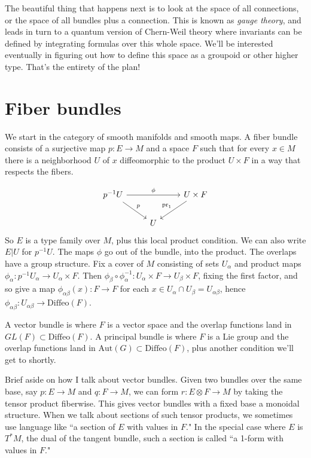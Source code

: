 \documentclass[12pt]{article}
\newcommand{\aut}{\mathrm{Aut}}
\begin{document}
The beautiful thing that happens next is to look at the space of all connections, or the space of all bundles plus a connection. This is known as \emph{gauge theory}, and leads in turn to a quantum version of Chern-Weil theory where invariants can be defined by integrating formulas over this whole space. We'll be interested eventually in figuring out how to define this space as a groupoid or other higher type. That's the entirety of the plan!

\section{Fiber bundles}
We start in the category of smooth manifolds and smooth maps. A fiber bundle consists of a surjective map $p:E\to M$ and a space $F$ such that for every $x\in M$ there is a neighborhood $U$ of $x$ diffeomorphic to the product $U\times F$ in a way that respects the fibers.

\[\begin{tikzcd}
	{p^{-1}U} && {U\times F} \\
	& U
	\arrow["p", from=1-1, to=2-2]
	\arrow["\phi", from=1-1, to=1-3]
	\arrow["{\mathrm{pr}_1}"', from=1-3, to=2-2]
\end{tikzcd}\]
So $E$ is a type family over $M$, plus this local product condition. We can also write $E|U$ for $p^{-1}U$. The maps $\phi$ go out of the bundle, into the product. The overlaps have a group structure. Fix a cover of $M$ consisting of sets $U_\alpha$ and product maps $\phi_\alpha:p^{-1}U_\alpha \to U_\alpha\times F$. Then $\phi_\beta\circ\phi_\alpha^{-1}: U_\alpha\times F\to U_\beta\times F$, fixing the first factor, and so give a map $\phi_{\alpha\beta}(x): F\to F$ for each $x\in U_\alpha\cap U_\beta = U_{\alpha\beta}$, hence $\phi_{\alpha\beta}:U_{\alpha\beta}\to \mathrm{Diffeo}(F)$. 

A vector bundle is where $F$ is a vector space and the overlap functions land in $GL(F)\subset\mathrm{Diffeo}(F)$. A principal bundle is where $F$ is a Lie group and the overlap functions land in $\aut(G)\subset \mathrm{Diffeo}(F)$, plus another condition we'll get to shortly.

Brief aside on how I talk about vector bundles. Given two bundles over the same base, say $p:E\to M$ and $q:F\to M$, we can form $r:E\otimes F\to M$ by taking the tensor product fiberwise. This gives vector bundles with a fixed base a monoidal structure. When we talk about sections of such tensor products, we sometimes use language like ``a section of $E$ with values in $F$." In the special case where $E$ is $T^*M$, the dual of the tangent bundle, such a section is called ``a 1-form with values in $F$."
\end{document}
